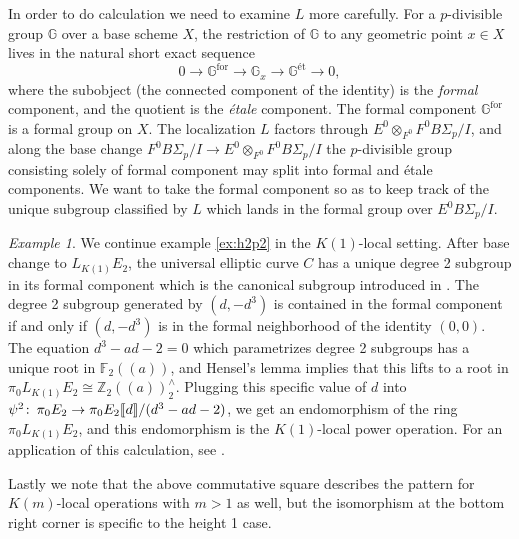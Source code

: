 \documentclass{gtpart}
\theoremstyle{definition}
\theoremstyle{remark}
\newtheorem{exam}[thm]{Example}
\def\co{\colon\thinspace}
\newcommand{\mb}[1]{\mathbb{#1}}
\begin{document}
In order to do calculation we need to examine $L$ more carefully.  
For a $p$-divisible group $\mb G$ over a base scheme $X$, the restriction 
of $\mb G$ to any geometric point $x \in X$ lives in the natural short 
exact sequence 
\[
 0 \to \mb G^{\text{for}} \to \mb G_x \to \mb G^{\text{\'et}} \to 0,
\]
where the subobject (the connected component of the identity) is the 
{\em formal} component, and the quotient is the {\em \'etale} component.  The
formal component $\mb G^{\text{for}}$ is a formal group on $X$.  The 
localization $L$ factors through $E^0 \otimes_{F^0} F^0 B\Sigma_p/I$, and along the base change 
$F^0 B\Sigma_p/I \to E^0 \otimes_{F^0} F^0 B\Sigma_p/I$ the $p$-divisible 
group consisting solely of formal component may split into formal and 
\'etale components.  We want to take the formal component so as to keep track of the 
unique subgroup classified by $L$ which lands in the formal group over 
$E^0 B\Sigma_p/I$.  

\begin{exam}
\label{ex:h1p2}
We continue example \ref{ex:h2p2} in the $K(1)$-local setting.  After 
base change to $L_{K(1)} E_2$, the universal elliptic curve $C$ has a 
unique degree 2 subgroup in its formal component which is the canonical 
subgroup introduced in \cite[theorem 1.4]{lubin}.  The degree 2 
subgroup generated by $(d,-d^3)$ is contained in the formal component if 
and only if $(d,-d^3)$ is in the formal neighborhood of the identity 
$(0,0)$.  The equation $d^3 - a d - 2 = 0$ which parametrizes degree 2 
subgroups has a unique root in ${\mb F}_2 (\!(a)\!)$, and Hensel's lemma 
implies that this lifts to a root in 
$\pi_0 L_{K(1)} E_2 \cong {\mb Z}_2 (\!(a)\!)_2^\wedge$.  Plugging this specific 
value of $d$ into $\psi^2\co \pi_0 E_2 \to \pi_0 E_2 \llbracket d \rrbracket /(d^3-ad-2)$, we 
get an endomorphism of the ring $\pi_0 L_{K(1)} E_2$, and this 
endomorphism is the $K(1)$-local power operation.  For an application of 
this calculation, see \cite[section 6]{level3}.
\end{exam}

Lastly we note that the above commutative square describes the pattern 
for $K(m)$-local operations with $m > 1$ as well, but the isomorphism at 
the bottom right corner is specific to the height 1 case.  
\end{document}
